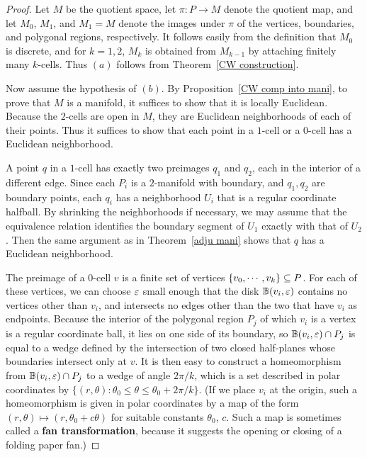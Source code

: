 \begin{proof}
Let $M$ be the quotient space, let $\pi:P\to M$ denote the quotient map, and let $M_0$, $M_1$, and $M_1=M$ denote the images under $\pi$ of the vertices, boundaries, and polygonal regions, respectively. It follows easily from the definition that $M_0$ is discrete, and for $k=1,2$, $M_k$ is obtained from $M_{k-1}$ by attaching finitely many $k$-cells. Thus $(a)$ follows from Theorem~\ref{CW construction}.\par
Now assume the hypothesis of $(b)$. By Proposition~\ref{CW comp into mani}, to prove that $M$ is a manifold, it suffices to show that it is locally Euclidean.
Because the $2$-cells are open in $M$, they are Euclidean neighborhoods of each
of their points. Thus it suffices to show that each point in a $1$-cell or a $0$-cell has a Euclidean neighborhood.\par
A point $q$ in a $1$-cell has exactly two preimages $q_1$ and $q_2$, each in the interior of a different edge. Since each $P_i$ is a $2$-manifold with boundary, and 
$q_1,q_2$ are boundary points, each $q_i$ has a neighborhood $U_i$ that is a regular coordinate halfball. By shrinking the neighborhoods if necessary, we may assume 
that the equivalence relation identifies the boundary segment of $U_1$ exactly with that of $U_2$. Then the same argument as in Theorem~\ref{adju mani} shows that 
$q$ has a Euclidean neighborhood.\par
The preimage of a $0$-cell $v$ is a finite set of vertices $\{v_0,\cdots,v_k\}\subseteq P$. For each of these vertices, we can choose $\varepsilon$ small enough that the disk $\mathbb{B}(v_i,\varepsilon)$ contains no vertices other than $v_i$, and intersects no edges other than the two that have $v_i$ as endpoints. Because the interior of the polygonal region $P_j$ of which $v_i$ is a vertex is a regular coordinate ball, it lies on one side of its boundary, so $\mathbb{B}(v_i,\varepsilon)\cap P_j$ is equal to a wedge defined by the intersection of two closed half-planes whose boundaries intersect only at $v$. It is then easy to construct a homeomorphism from $\mathbb{B}(v_i,\varepsilon)\cap P_j$ to a wedge of angle $2\pi/k$, which is a set described in polar coordinates by $\{(r,\theta):\theta_0\leq\theta\leq\theta_0+2\pi/k\}$. (If we place $v_i$ at the origin, such a homeomorphism is given in polar coordinates by a map of the form $(r,\theta)\mapsto(r,\theta_0+c\theta)$ for suitable constants $\theta_0$, $c$. Such a map is sometimes called a \textbf{fan transformation}, because it suggests the opening or closing of a folding paper fan.)

\end{proof}
